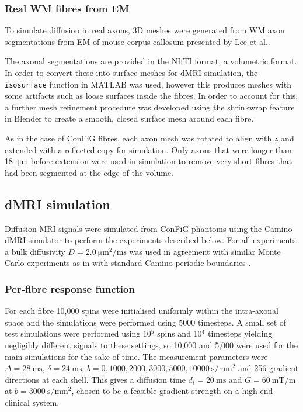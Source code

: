 
\subsubsection{Real WM fibres from EM}
\label{sec:frf_real_axon_meshing}
To simulate diffusion in real axons, 3D meshes were generated from \ac{WM} axon segmentations from \acf{EM} of mouse corpus callosum presented by Lee et al.\cite{Lee2019b}.

The axonal segmentations are provided in the NIfTI format, a volumetric format. In order to convert these into surface meshes for \ac{dMRI} simulation, the \texttt{isosurface} function in MATLAB was used, however this produces meshes with some artifacts such as loose surfaces inside the fibres.
In order to account for this, a further mesh refinement procedure was developed using the shrinkwrap feature in Blender to create a smooth, closed surface mesh around each fibre.

As in the case of ConFiG fibres, each axon mesh was rotated to align with $z$ and extended with a reflected copy for simulation. Only axons that were longer than \SI{18}{\micro\metre} before extension were used in simulation to remove very short fibres that had been segmented at the edge of the volume. 



\subsection{dMRI simulation}
\label{sec:frf_dMRI_simulation}
Diffusion MRI signals were simulated from ConFiG phantoms using the Camino \ac{dMRI} simulator \cite{Cook2006,Hall2009} to perform the experiments described below. For all experiments a bulk diffusivity $D = \SI{2.0}{\micro\metre\squared\per\milli\second}$ was used in agreement with similar Monte Carlo experiments as in  with standard Camino periodic boundaries \cite{Panagiotaki2010}.


\subsubsection{Per-fibre response function}
For each fibre 10,000 spins were initialised uniformly within the intra-axonal space and the simulations were performed using 5000 timesteps. A small set of test simulations were performed using 10$^5$ spins and 10$^4$ timesteps yielding negligibly different signals to these settings, so 10,000 and 5,000 were used for the main simulations for the sake of time. The measurement parameters were $\Delta = \SI{28}{\milli\second}$, $\delta = \SI{24}{\milli\second}$, $b = 0,1000,2000,3000,5000,\SI{10000}{\second\per\milli\metre\squared}$ and 256 gradient directions at each shell. This gives a diffusion time $d_t = \SI{20}{\milli\second}$ and $G = \SI{60}{\milli\tesla\per\metre}$ at $b = \SI{3000}{\second\per\milli\metre\squared}$, chosen to be a feasible gradient strength on a high-end clinical system.

